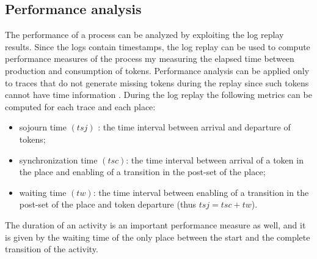 \documentclass{llncs}
\begin{document}

\subsection{Performance analysis}\label{PerformanceAnalysis}
The performance of a process can be analyzed by exploiting the log
replay results. Since the logs contain timestamps, the log replay can
be used to compute performance measures of the process my measuring the elapsed time between production and consumption of tokens. Performance analysis can be applied only to traces that do not generate missing tokens during the replay since such tokens cannot have time information \cite{2} . During the log replay the following metrics can be computed for each trace and each place:
\begin{itemize}
\item sojourn time $(tsj)$ : the time interval between arrival and departure of tokens;
\item synchronization time $(tsc)$: the time interval between arrival of a token in the place and enabling of a transition in the post-set of the place;
\item waiting time $(tw)$:  the time interval between enabling of a transition in the post-set of the place and token departure (thus $tsj=tsc+tw $).
\end{itemize}

The duration of an activity is an important performance measure as well, and it is given by the waiting time of the only place between the start and the complete transition of the activity.
\end{document}
